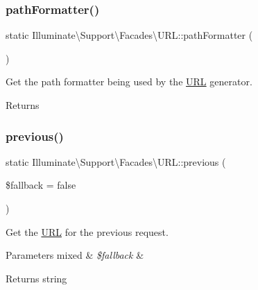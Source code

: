 \subsubsection{\texorpdfstring{path\+Formatter()}{pathFormatter()}}
{\footnotesize\ttfamily static Illuminate\textbackslash{}\+Support\textbackslash{}\+Facades\textbackslash{}\+U\+R\+L\+::path\+Formatter (\begin{DoxyParamCaption}{ }\end{DoxyParamCaption})\hspace{0.3cm}{\ttfamily [static]}}

Get the path formatter being used by the \mbox{\hyperlink{class_illuminate_1_1_support_1_1_facades_1_1_u_r_l}{U\+RL}} generator.

\begin{DoxyReturn}{Returns}

\end{DoxyReturn}
\mbox{\label{class_illuminate_1_1_support_1_1_facades_1_1_u_r_l_aa702c8032493dc9dd9b41ff7836aca40}} 
\subsubsection{\texorpdfstring{previous()}{previous()}}
{\footnotesize\ttfamily static Illuminate\textbackslash{}\+Support\textbackslash{}\+Facades\textbackslash{}\+U\+R\+L\+::previous (\begin{DoxyParamCaption}\item[{}]{\$fallback = {\ttfamily false} }\end{DoxyParamCaption})\hspace{0.3cm}{\ttfamily [static]}}

Get the \mbox{\hyperlink{class_illuminate_1_1_support_1_1_facades_1_1_u_r_l}{U\+RL}} for the previous request.


\begin{DoxyParams}[1]{Parameters}
mixed & {\em \$fallback} & \\
\hline
\end{DoxyParams}
\begin{DoxyReturn}{Returns}
string 
\end{DoxyReturn}
\mbox{\label{class_illuminate_1_1_support_1_1_facades_1_1_u_r_l_a993fae36ed2677c36bc9e4b72aa31184}} 
